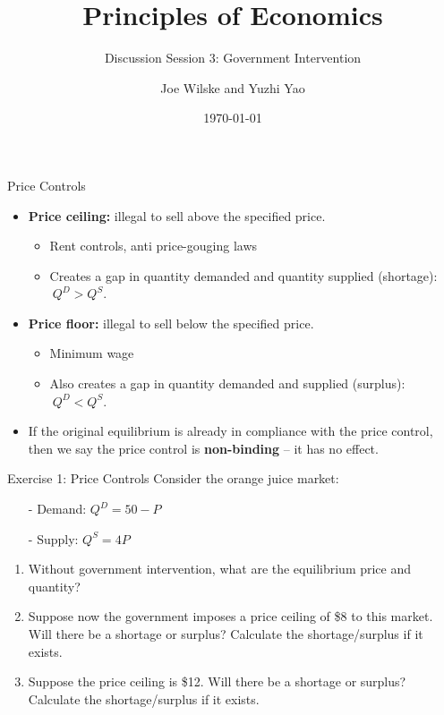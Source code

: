 \documentclass[9pt, handout]{beamer}
\title{Principles of Economics}
\subtitle{Discussion Session 3: Government Intervention}
\author{Joe Wilske and Yuzhi Yao}
\institute{Boston College}
\date{\today}
\begin{document}
\frame{\titlepage}

\begin{frame}{Price Controls}
    \begin{itemize}
        \item \textbf{Price ceiling:} illegal to sell above the specified price.
        \begin{itemize}
            \item Rent controls, anti price-gouging laws
            \item Creates a gap in quantity demanded and quantity supplied (shortage): $\: Q^D > Q^S$.
            \vspace{5pt}
        \end{itemize}
        \item \textbf{Price floor:} illegal to sell below the specified price.
        \begin{itemize}
            \item Minimum wage
            \item Also creates a gap in quantity demanded and supplied (surplus): $\: Q^D < Q^S$.
        \end{itemize}
        \vspace{5pt}
        \item If the original equilibrium is already in compliance with the price control, then we say the price control is \textbf{non-binding} -- it has no effect.
    \end{itemize}
\end{frame}

\begin{frame}{Exercise 1: Price Controls}
    Consider the orange juice market: 
    \begin{itemize}
        \item[-] Demand: $Q^D = 50 - P$
        \item[-] Supply: $Q^S = 4P$
    \end{itemize}
    \begin{enumerate}
        \item Without government intervention, what are the equilibrium price and quantity? 
        \item Suppose now the government imposes a price ceiling of \$8 to this market. Will there be a shortage or surplus? Calculate the shortage/surplus if it exists. 
        \item Suppose the price ceiling is \$12. Will there be a shortage or surplus? Calculate the shortage/surplus if it exists. 
    \end{enumerate}
    \vspace{1in}
\end{frame}
\end{document}
